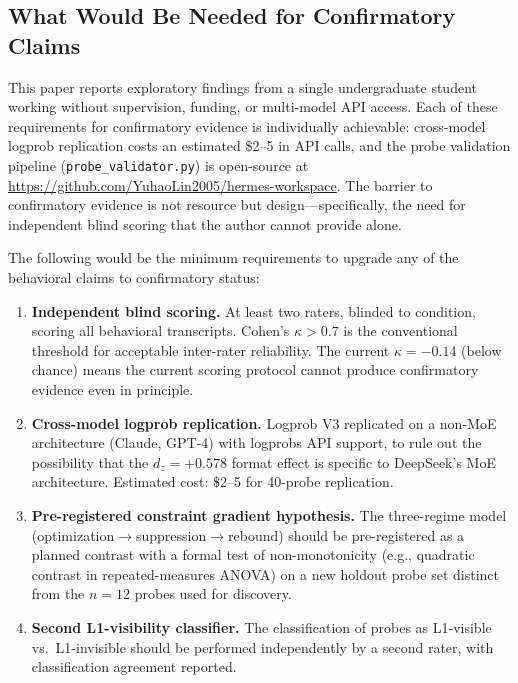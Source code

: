 \documentclass[11pt]{article}
\begin{document}
\subsection{What Would Be Needed for Confirmatory Claims}
\label{sec:whatweneed}

This paper reports exploratory findings from a single undergraduate student
working without supervision, funding, or multi-model API access. Each of these
requirements for confirmatory evidence is individually achievable: cross-model
logprob replication costs an estimated \$2--5 in API calls, and the probe
validation pipeline (\texttt{probe\_validator.py}) is open-source at
\url{https://github.com/YuhaoLin2005/hermes-workspace}. The barrier to
confirmatory evidence is not resource but design---specifically, the need for
independent blind scoring that the author cannot provide alone.

The following
would be the minimum requirements to upgrade any of the behavioral claims to
confirmatory status:

\begin{enumerate}
\item \textbf{Independent blind scoring.} At least two raters, blinded to
  condition, scoring all behavioral transcripts. Cohen's $\kappa > 0.7$ is the
  conventional threshold for acceptable inter-rater reliability. The current
  $\kappa = -0.14$ (below chance) means the current scoring protocol cannot
  produce confirmatory evidence even in principle.
\item \textbf{Cross-model logprob replication.} Logprob V3 replicated on a
  non-MoE architecture (Claude, GPT-4) with logprobs API support, to rule out
  the possibility that the $d_z=+0.578$ format effect is specific to DeepSeek's
  MoE architecture. Estimated cost: \$2--5 for 40-probe replication.
\item \textbf{Pre-registered constraint gradient hypothesis.} The three-regime
  model (optimization$\to$suppression$\to$rebound) should be pre-registered as a
  planned contrast with a formal test of non-monotonicity (e.g., quadratic
  contrast in repeated-measures ANOVA) on a new holdout probe set distinct from
  the $n=12$ probes used for discovery.
\item \textbf{Second L1-visibility classifier.} The classification of probes as
  L1-visible vs.\ L1-invisible should be performed independently by a second
  rater, with classification agreement reported.
\end{enumerate}
\end{document}
